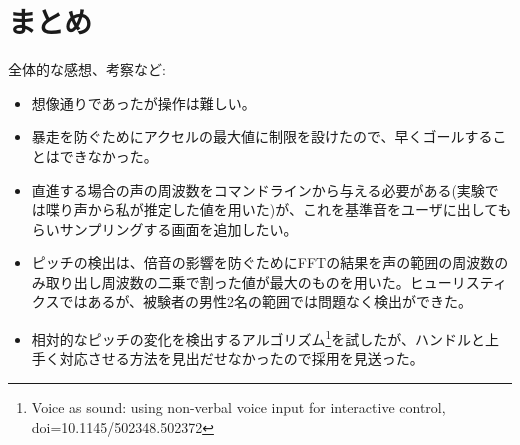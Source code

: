 \documentclass[a4j]{jarticle}
\begin{document}
\section{まとめ}
全体的な感想、考察など:
\begin{itemize}
\item 想像通りであったが操作は難しい。
\item 暴走を防ぐためにアクセルの最大値に制限を設けたので、早くゴールすることはできなかった。
\item 直進する場合の声の周波数をコマンドラインから与える必要がある(実験では喋り声から私が推定した値を用いた)が、これを基準音をユーザに出してもらいサンプリングする画面を追加したい。
\item ピッチの検出は、倍音の影響を防ぐためにFFTの結果を声の範囲の周波数のみ取り出し周波数の二乗で割った値が最大のものを用いた。ヒューリスティクスではあるが、被験者の男性2名の範囲では問題なく検出ができた。
\item 相対的なピッチの変化を検出するアルゴリズム\footnote{Voice as sound: using non-verbal voice input for interactive control, doi=10.1145/502348.502372}を試したが、ハンドルと上手く対応させる方法を見出だせなかったので採用を見送った。
\end{itemize}
\end{document}
